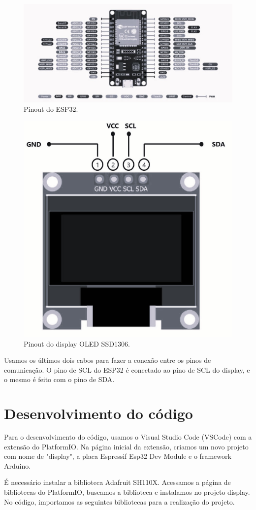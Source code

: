 \documentclass[12pt]{article}
\begin{document}
\begin{figure}[H]
    \centering
    \includegraphics[width=0.5\linewidth]{img/esp32_pinout.png}
    \caption{Pinout do ESP32.}
    \label{fig:esp32-pinout}
\end{figure}

\begin{figure}[H]
    \centering
    \includegraphics[width=0.5\linewidth]{img/I2C-OLED-Display-Pinout.jpg}
    \caption{Pinout do display OLED SSD1306.}
    \label{fig:enter-label}
\end{figure}

Usamos os últimos dois cabos para fazer a conexão entre os pinos de comunicação. O pino de SCL do ESP32 é conectado ao pino de SCL do display, e o mesmo é feito com o pino de SDA.

\section{Desenvolvimento do código}

Para o desenvolvimento do código, usamos o Visual Studio Code (VSCode) com a extensão do PlatformIO. Na página inicial da extensão, criamos um novo projeto com nome de "display", a placa Espressif Esp32 Dev Module e o framework Arduino.

É necessário instalar a biblioteca Adafruit SH110X. Acessamos a página de bibliotecas do PlatformIO, buscamos a biblioteca e instalamos no projeto display. No código, importamos as seguintes bibliotecas para a realização do projeto.
\end{document}
